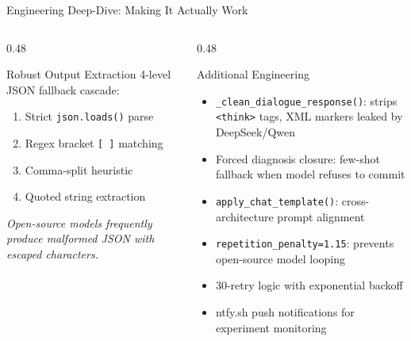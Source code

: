 \documentclass[aspectratio=169,11pt]{beamer}
\begin{document}
\begin{frame}{Engineering Deep-Dive: Making It Actually Work}
\begin{columns}[T]
\begin{column}{0.48\textwidth}
\begin{block}{\small Robust Output Extraction}
\footnotesize
4-level JSON fallback cascade:
\begin{enumerate}
  \item Strict \texttt{json.loads()} parse
  \item Regex bracket \texttt{[\,]} matching
  \item Comma-split heuristic
  \item Quoted string extraction
\end{enumerate}
\vspace{0.3em}
\textit{Open-source models frequently produce malformed JSON with escaped characters.}
\end{block}
\end{column}
\begin{column}{0.48\textwidth}
\begin{block}{\small Additional Engineering}
\footnotesize
\begin{itemize}
  \item \texttt{\_clean\_dialogue\_response()}: strips \texttt{<think>} tags, XML markers leaked by DeepSeek/Qwen
  \item Forced diagnosis closure: few-shot fallback when model refuses to commit
  \item \texttt{apply\_chat\_template()}: cross-architecture prompt alignment
  \item \texttt{repetition\_penalty=1.15}: prevents open-source model looping
  \item 30-retry logic with exponential backoff
  \item ntfy.sh push notifications for experiment monitoring
\end{itemize}
\end{block}
\end{column}
\end{columns}

\end{frame}
\end{document}
